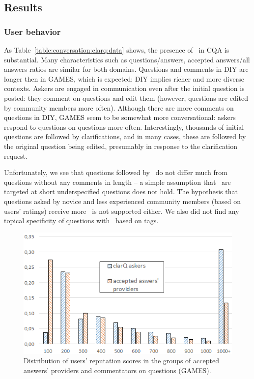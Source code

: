 \subsection{Results}
\label{section:conversation:clarq:results}

\subsubsection{User behavior}
\label{section:conversation:clarq:behavior}

As Table~\ref{table:conversation:clarq:data} shows, the presence of \clarQ~in CQA is substantial. Many characteristics such as questions/answers, accepted answers/all answers ratios are similar for both domains.
Questions and comments in DIY are longer then in GAMES, which is expected: DIY implies richer and more diverse contexts.
Askers are engaged in communication even after the initial question is posted: they comment on questions and edit them (however, questions are edited by community members more often).
Although there are more comments on questions in DIY, GAMES seem to be somewhat more conversational: askers respond to questions on questions more often.
Interestingly, thousands of initial questions are followed by clarifications, and in many cases, these are followed by the original question being edited, presumably in response to the clarification request. 

Unfortunately, we see that questions followed by \clarQ~do not differ much from questions without any comments in length -- a simple assumption that \clarQ~are targeted at short underspecified questions does not hold.
The hypothesis that questions asked by novice and less experienced community members (based on users' ratings) receive more \clarQ~is not supported either.
We also did not find any topical specificity of questions with \clarQ~based on tags. 

\begin{figure}
\centering
\includegraphics[width=.75\linewidth]{img/user_ratings.png}
\caption{Distribution of users' reputation scores in the groups of accepted answers' providers and commentators on questions (GAMES).}
\label{figure:conversation:clarq:users_scores}
\end{figure}

